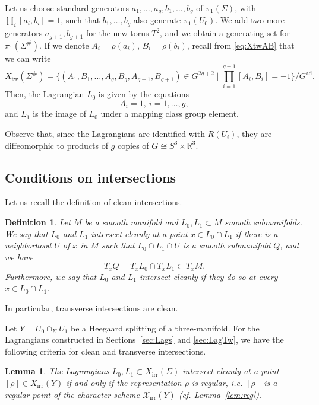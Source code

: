 \documentclass [11pt]{amsart}
\newtheorem {lemma}[theorem]{Lemma}
\newtheorem {definition}[theorem]{Definition}
\theoremstyle{remark}
\def\rr {{\mathbb{R}}}
\def\R{\rr}
\def\Gad{G^{\operatorname{ad}}}
\def\Rep {R}
\def\Char {X}
\def\CharIrr {\Char_{\operatorname{irr}}}
\def\CharsIrr {\mathscr{X}_{\operatorname{irr}}}
\def\Xtw{\Char_{\operatorname{tw}}}
\begin{document}
Let us choose standard generators $a_1, \dots, a_g, b_1, \dots, b_g$ of $\pi_1(\Sigma)$, with $\prod_i [a_i, b_i]=1$, such that $b_1, \dots, b_g$ also generate $\pi_1(U_0).$ We add two more generators $a_{g+1}, b_{g+1}$ for the new torus $T^2$, and we obtain a generating set for $\pi_1(\Sigma^{\#})$. If we denote $A_i=\rho(a_i)$, $B_i=\rho(b_i)$, recall from \eqref{eq:XtwAB} that we can write
$$ \Xtw(\Sigma^{\#}) =\bigl \{ (A_1, B_1, \dots, A_g, B_g, A_{g+1}, B_{g+1}) \in G^{2g+2}  \mid \prod_{i=1}^{g+1} [A_i, B_i]=-1\}/\Gad.
 $$
Then, the Lagrangian $L_0$ is given by the equations
$$ A_i =1, \ i=1, \dots, g,$$
and $L_1$ is the image of $L_0$ under a mapping class group element. 

Observe that, since the Lagrangians are identified with $\Rep(U_i)$, they are diffeomorphic to products of $g$ copies of $G \cong S^3 \times \R^3$.


\subsection{Conditions on intersections} Let us recall the definition of clean intersections.

\begin{definition}
\label{def:clean}
Let $M$ be a smooth manifold and $L_0, L_1 \subset M$ smooth submanifolds. We say that $L_0$ and $L_1$ intersect {\em cleanly} at a point $x \in L_0 \cap L_1$ if there is a neighborhood $U$ of $x$ in $M$ such that $L_0 \cap L_1 \cap U$ is a smooth submanifold $Q$, and we have
$$ T_x Q = T_x L_0 \cap T_x L_1 \subset T_x M.$$
Furthermore, we say that $L_0$ and $L_1$ intersect cleanly if they do so at every $x \in L_0 \cap L_1$.
\end{definition}

In particular, transverse intersections are clean.

Let $Y = U_0 \cap_{\Sigma} U_1$ be a Heegaard splitting of a three-manifold. For the Lagrangians constructed in Sections~\ref{sec:Lags} and \ref{sec:LagTw}, we have the following criteria for clean and transverse intersections.

\begin{lemma}
\label{lem:cleanChar}
The Lagrangians $L_0, L_1 \subset \CharIrr(\Sigma)$ intersect cleanly at a point $[\rho] \in \CharIrr(Y)$ if and only if the representation $\rho$ is regular, i.e. $[\rho]$ is a regular point of the character scheme $\CharsIrr(Y)$ (cf. Lemma~\ref{lem:reg}).
\end{lemma}
\end{document}
